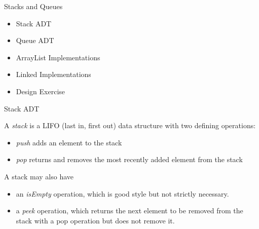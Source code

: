 \documentclass{beamer}
\author[Chris Simpkins] 
{Christopher Simpkins \\\texttt{chris.simpkins@gatech.edu}}
\institute[Georgia Tech] %
\date[CS 1331]{}
\begin{document}
\begin{frame}
  \titlepage
\end{frame}

\begin{frame}[fragile]{Stacks and Queues}

\begin{itemize}
\item Stack ADT
\item Queue ADT
\item ArrayList Implementations
\item Linked Implementations
\item Design Exercise
\end{itemize}


\end{frame}


\begin{frame}[fragile]{Stack ADT}


A {\it stack} is a LIFO (last in, first out) data structure with two defining operations:
\begin{itemize}
\item {\it push} adds an element to the stack
\item {\it pop} returns and removes the most recently added element from the stack
\end{itemize}

A stack may also have 
\begin{itemize}
\item an {\it isEmpty} operation, which is good style but not strictly necessary.
\item a {\it peek} operation, which returns the next element to be removed from the stack with a pop operation but does not remove it.
\end{itemize}



\end{frame}
\end{document}
